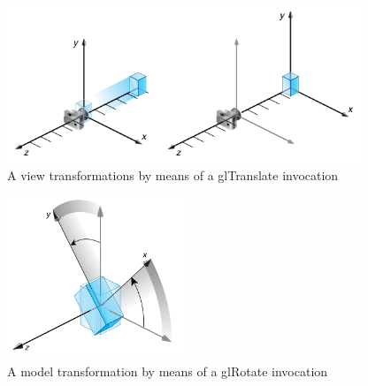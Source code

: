 \begin{figure}[!h]
  \begin{center}
    \includegraphics[width=300pt]{img/gltranslate.png}
    \caption{A view transformations by means of a glTranslate invocation}
    \label{fig:gltranslate}
  \end{center}
\end{figure}

\begin{figure}[ht]
  \begin{center}
    \includegraphics[width=150pt]{img/glrotate.png}
    \caption{A model transformation by means of a glRotate invocation}
    \label{fig:glrotate}
  \end{center}
\end{figure}
